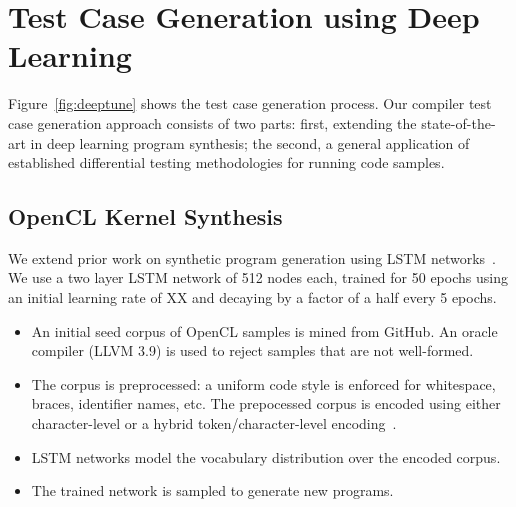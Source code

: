 \section{Test Case Generation using Deep Learning}

Figure~\ref{fig:deeptune} shows the test case generation process. Our compiler test case generation approach consists of two parts: first, extending the state-of-the-art in deep learning program synthesis; the second, a general application of established differential testing methodologies for running code samples.


\subsection{OpenCL Kernel Synthesis}

We extend prior work on synthetic program generation using LSTM networks~\cite{Cummins2017a}. We use a two layer LSTM network of 512 nodes each, trained for 50 epochs using an initial learning rate of XX and decaying by a factor of a half every 5 epochs.

\begin{itemize}
\item An initial seed corpus of OpenCL samples is mined from GitHub. An oracle compiler (LLVM 3.9) is used to reject samples that are not well-formed.
\item The corpus is preprocessed: a uniform code style is enforced for whitespace, braces, identifier names, etc. The prepocessed corpus is encoded using either character-level or a hybrid token/character-level encoding~\cite{Cummins2017b}.
\item LSTM networks model the vocabulary distribution over the encoded corpus.
\item The trained network is sampled to generate new programs.
\end{itemize}

%



